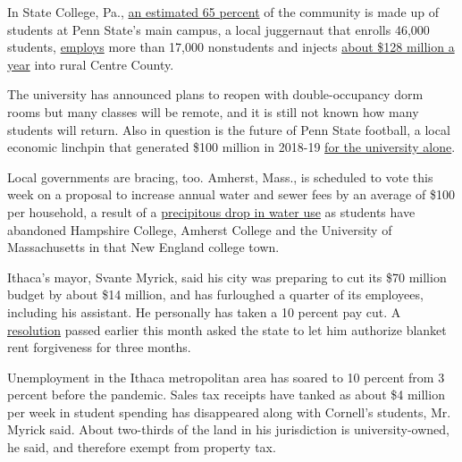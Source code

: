 In State College, Pa.,
\href{http://www.statecollegepa.us/DocumentCenter/View/9291/State-College-Neighborhood-Plan-Borough-Wide-Conditions?bidId=}{an
estimated 65 percent} of the community is made up of students at Penn
State's main campus, a local juggernaut that enrolls 46,000 students,
\href{https://factbook.psu.edu/factbook/HrDynamic/EmployeesbyClassificationSummaryPSULaw.aspx?YearCode=2019humors\&FBPlusIndc=N}{employs}
more than 17,000 nonstudents and injects
\href{https://www.psu.edu/ur/newsdocuments/Penn-State_Economic-Contribution-Study_February-2019.pdf}{about
\$128 million a year} into rural Centre County.

The university has announced plans to reopen with double-occupancy dorm
rooms but many classes will be remote, and it is still not known how
many students will return. Also in question is the future of Penn State
football, a local economic linchpin that generated \$100 million in
2018-19
\href{https://www.scribd.com/document/448272170/Penn-State-2018-19-fiscal-year-NCAA-Report-Final\#from_embed?campaign=SkimbitLtd\&ad_group=126006X1587341X3675db3cbb273c0b115aafcc767f8ca5\&keyword=660149026\&source=hp_affiliate\&medium=affiliate}{for
the university alone}.

Local governments are bracing, too. Amherst, Mass., is scheduled to vote
this week on a proposal to increase annual water and sewer fees by an
average of \$100 per household, a result of a
\href{https://www.amherstma.gov/DocumentCenter/View/51625/8b-FY21-Water-and-Sewer-Rate-Memo---61220-FINAL}{precipitous
drop in water use} as students have abandoned Hampshire College, Amherst
College and the University of Massachusetts in that New England college
town.

Ithaca's mayor, Svante Myrick, said his city was preparing to cut its
\$70 million budget by about \$14 million, and has furloughed a quarter
of its employees, including his assistant. He personally has taken a 10
percent pay cut. A
\href{https://www.ithacatu.org/cancelrent}{resolution} passed earlier
this month asked the state to let him authorize blanket rent forgiveness
for three months.

Unemployment in the Ithaca metropolitan area has soared to 10 percent
from 3 percent before the pandemic. Sales tax receipts have tanked as
about \$4 million per week in student spending has disappeared along
with Cornell's students, Mr. Myrick said. About two-thirds of the land
in his jurisdiction is university-owned, he said, and therefore exempt
from property tax.

